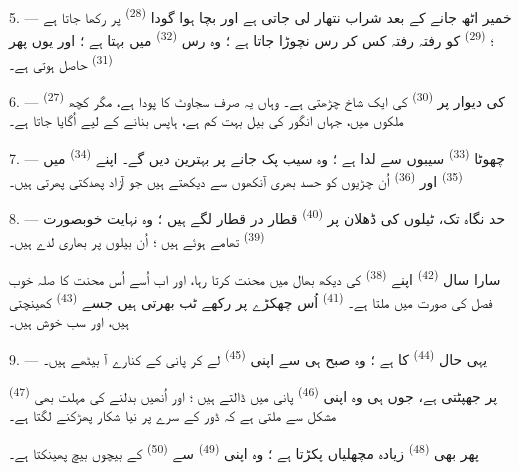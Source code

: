 5. --- خمیر اٹھ جانے کے بعد شراب نتھار لی جاتی ہے اور بچا ہوا گودا
 \textsuperscript{(28)} پر رکھا جاتا ہے ؛ 
\textsuperscript{(29)} کو رفتہ رفتہ کس کر رس نچوڑا جاتا ہے ؛ وہ رس
 \textsuperscript{(32)} میں بہتا ہے ؛ اور یوں پھر
 \textsuperscript{(31)} حاصل ہوتی ہے۔

\VUsaut{6.0mm}
\VUsaut{3.4mm}

6. ---  \textsuperscript{(27)} کی دیوار پر
 \textsuperscript{(30)} کی ایک شاخ چڑھتی ہے۔ وہاں یہ صرف
سجاوٹ کا پودا ہے، مگر کچھ ملکوں میں، جہاں انگور کی بیل بہت کم ہے،
ہاپس  بنانے کے لیے اُگایا جاتا ہے۔

7. --- چھوٹا  \textsuperscript{(33)} سیبوں سے لدا
ہے ؛ وہ سیب پک جانے پر بہترین  دیں گے۔ اپنے
 \textsuperscript{(34)} میں 
\textsuperscript{(35)} اور  \textsuperscript{(36)} اُن
چڑیوں کو حسد بھری آنکھوں سے دیکھتے ہیں جو آزاد پھدکتی پھرتی ہیں۔

8. --- حد نگاہ تک، ٹیلوں کی ڈھلان پر 
\textsuperscript{(40)} قطار در قطار لگے ہیں ؛ وہ نہایت خوبصورت
 \textsuperscript{(39)} تھامے ہوئے ہیں ؛ اُن
بیلوں پر بھاری  لدے ہیں۔

سارا سال  \textsuperscript{(42)} اپنے
 \textsuperscript{(38)} کی دیکھ بھال میں محنت کرتا
رہا، اور اب اُسے اُس محنت کا صلہ خوب فصل کی صورت میں ملتا ہے۔
 \textsuperscript{(41)} اُس چھکڑے پر رکھے
ٹب بھرتی ہیں جسے  \textsuperscript{(43)} کھینچتی ہیں،
اور سب خوش ہیں۔

\VUsaut{5.0mm}
\VUsaut{3.4mm}

9. --- یہی حال  \textsuperscript{(44)}
کا ہے ؛ وہ صبح ہی سے اپنی 
\textsuperscript{(45)} لے کر پانی کے کنارے آ بیٹھے ہیں۔

 \textsuperscript{(47)}  پر جھپٹتی ہے، جوں
ہی وہ اپنی  \textsuperscript{(46)} پانی میں ڈالتے ہیں ؛ اور
اُنھیں  بدلنے کی مہلت بھی مشکل سے ملتی ہے کہ ڈور کے سرے
پر نیا شکار پھڑکنے لگتا ہے۔

پھر بھی  \textsuperscript{(48)} زیادہ
مچھلیاں پکڑتا ہے ؛ وہ اپنی  \textsuperscript{(49)} سے
  \textsuperscript{(50)} کے بیچوں
بیچ پھینکتا ہے۔

